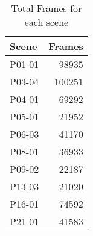 \begin{table}[]
    \centering
    \begin{tabular}{lr}
    \hline
    \textbf{Scene} & \multicolumn{1}{c}{\textbf{Frames}} \\ \hline
    P01-01         & 98935                               \\
    P03-04         & 100251                              \\
    P04-01         & 69292                               \\
    P05-01         & 21952                               \\
    P06-03         & 41170                               \\
    P08-01         & 36933                               \\
    P09-02         & 22187                               \\
    P13-03         & 21020                               \\
    P16-01         & 74592                               \\
    P21-01         & 41583                               \\ \hline
    \end{tabular}
    \caption{Total Frames for each scene}\label{tab:Frames}
    \end{table}